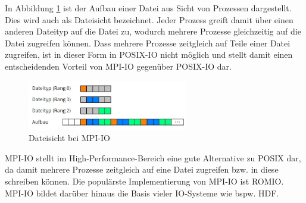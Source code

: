 In Abbildung \ref{fig:dateisicht} ist der Aufbau einer Datei aus Sicht von Prozessen dargestellt. Dies wird auch als Dateisicht bezeichnet. Jeder Prozess greift damit \"uber einen anderen Dateityp auf die Datei zu, wodurch mehrere Prozesse gleichzeitig auf die Datei zugreifen k\"onnen. Dass mehrere Prozesse zeitgleich auf Teile einer Datei zugreifen, ist in dieser Form in POSIX-IO nicht m\"oglich und stellt damit einen entscheidenden Vorteil von MPI-IO gegen\"uber POSIX-IO dar.

\begin{figure}[h]
	\centering
	\includegraphics[width=7cm]{fig/Dateisicht.jpg}
	\caption{Dateisicht bei MPI-IO \cite{Kuhn.13.05.2016}}
	\label{fig:dateisicht}
\end{figure}
MPI-IO stellt im High-Performance-Bereich eine gute Alternative zu POSIX dar, da damit mehrere Prozesse zeitgleich auf eine Datei zugreifen bzw. in diese schreiben k\"onnen. Die popul\"arste Implementierung von MPI-IO ist ROMIO. MPI-IO bildet dar\"uber hinaus die Basis vieler IO-Systeme wie bspw. HDF.\cite{Corbett.1995}\cite{Kuhn.13.05.2016}
